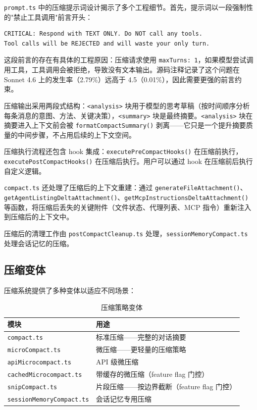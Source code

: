 \texttt{prompt.ts} 中的压缩提示词设计揭示了多个工程细节。首先，提示词以一段强制性的"禁止工具调用"前言开头：

\begin{lstlisting}[language={}]
CRITICAL: Respond with TEXT ONLY. Do NOT call any tools.
Tool calls will be REJECTED and will waste your only turn.
\end{lstlisting}

这段前言的存在有具体的工程原因：压缩请求使用 \texttt{maxTurns: 1}，如果模型尝试调用工具，工具调用会被拒绝，导致没有文本输出。源码注释记录了这个问题在 Sonnet 4.6 上的发生率（2.79\%）远高于 4.5（0.01\%），因此需要更强的前言约束。

压缩输出采用两段式结构：\texttt{<analysis>} 块用于模型的思考草稿（按时间顺序分析每条消息的意图、方法、关键决策），\texttt{<summary>} 块是最终摘要。\texttt{<analysis>} 块在摘要进入上下文前会被 \texttt{formatCompactSummary()} 剥离——它只是一个提升摘要质量的中间步骤，不占用后续的上下文空间。

压缩执行流程还包含 hook 集成：\texttt{executePreCompactHooks()} 在压缩前执行，\texttt{executePostCompactHooks()} 在压缩后执行。用户可以通过 hook 在压缩前后执行自定义逻辑。

\texttt{compact.ts} 还处理了压缩后的上下文重建：通过 \texttt{generateFileAttachment()}、\texttt{getAgentListingDeltaAttachment()}、\texttt{getMcpInstructionsDeltaAttachment()} 等函数，将压缩后丢失的关键附件（文件状态、代理列表、MCP 指令）重新注入到压缩后的上下文中。

压缩后的清理工作由 \texttt{postCompactCleanup.ts} 处理，\texttt{sessionMemoryCompact.ts} 处理会话记忆的压缩。

\subsection{压缩变体}

压缩系统提供了多种变体以适应不同场景：

\begin{table}[htbp]
\centering
\begin{tabularx}{\textwidth}{lX}
\toprule
\textbf{模块} & \textbf{用途} \\
\midrule
\texttt{compact.ts} & 标准压缩——完整的对话摘要 \\
\texttt{microCompact.ts} & 微压缩——更轻量的压缩策略 \\
\texttt{apiMicrocompact.ts} & API 级微压缩 \\
\texttt{cachedMicrocompact.ts} & 带缓存的微压缩（feature flag 门控） \\
\texttt{snipCompact.ts} & 片段压缩——按边界截断（feature flag 门控） \\
\texttt{sessionMemoryCompact.ts} & 会话记忆专用压缩 \\
\bottomrule
\end{tabularx}
\caption{压缩策略变体}
\end{table}

